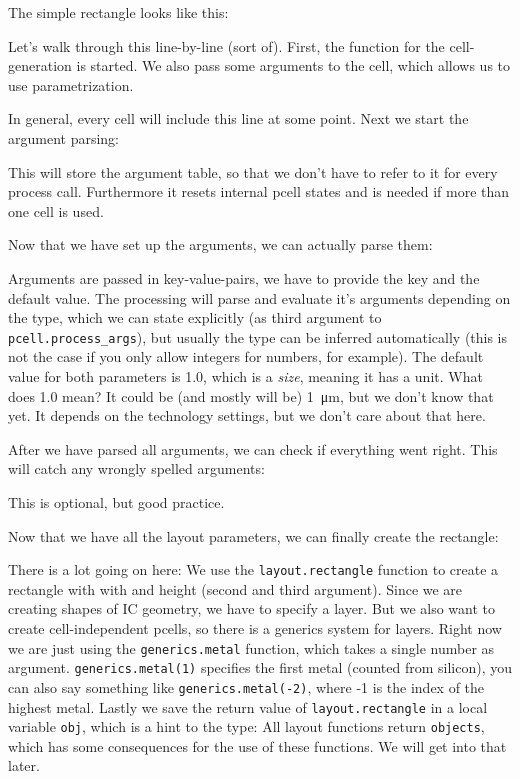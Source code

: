 The simple rectangle looks like this:

Let's walk through this line-by-line (sort of). First, the function for the cell-generation is started. We also pass some arguments to the cell, which allows us to
use parametrization.

In general, every cell will include this line at some point. Next we start the argument parsing:

This will store the argument table, so that we don't have to refer to it for every process call. Furthermore it resets internal pcell states and is needed if more
than one cell is used.

Now that we have set up the arguments, we can actually parse them:

Arguments are passed in key-value-pairs, we have to provide the key and the default value. The processing will parse and evaluate it's arguments depending on the
type, which we can state explicitly (as third argument to \lstinline!pcell.process_args!), but usually the type can be inferred automatically (this is not the case
if you only allow integers for numbers, for example). The default value for both parameters is 1.0, which is a \emph{size}, meaning it has a unit. What does 1.0
mean? It could be (and mostly will be) \SI{1}{\micro\meter}, but we don't know that yet. It depends on the technology settings, but we don't care about that here.

After we have parsed all arguments, we can check if everything went right. This will catch any wrongly spelled arguments: 

This is optional, but good practice.

Now that we have all the layout parameters, we can finally create the rectangle:

There is a lot going on here: We use the \lstinline!layout.rectangle! function to create a rectangle with with and height (second and third argument). Since we are
creating shapes of IC geometry, we have to specify a layer. But we also want to create cell-independent pcells, so there is a generics system for layers. Right now
we are just using the \lstinline!generics.metal! function, which takes a single number as argument. \lstinline!generics.metal(1)! specifies the first metal (counted
from silicon), you can also say something like \lstinline!generics.metal(-2)!, where -1 is the index of the highest metal. Lastly we save the return value of
\lstinline!layout.rectangle! in a local variable \lstinline!obj!, which is a hint to the type: All layout functions return \lstinline!objects!, which has some
consequences for the use of these functions. We will get into that later.

